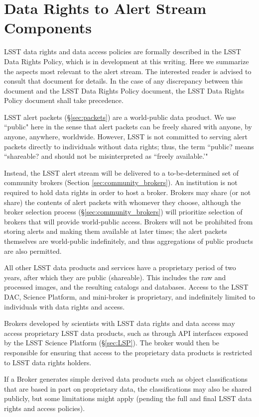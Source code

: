 \section{Data Rights to Alert Stream Components}\label{sec:data_rights}

LSST data rights and data access policies are formally described in the LSST Data Rights Policy, which is in development at this writing.
Here we summarize the aspects most relevant to the alert stream.
The interested reader is advised to consult that document for details.
In the case of any discrepancy between this document and the LSST Data Rights Policy document, the LSST Data Rights Policy document shall take precedence.

LSST alert packets (\S \ref{sec:packets}) are a world-public data product.
We use ``public" here in the sense that alert packets can be freely shared with anyone, by anyone, anywhere, worldwide.
However, LSST is not committed to serving alert packets directly to individuals without data rights; thus, the term ``public? means ``shareable? and should not be misinterpreted as ``freely available.'"

Instead, the LSST alert stream will be delivered to a to-be-determined set of community brokers (Section \ref{sec:community_brokers}).
An institution is not required to hold data rights in order to host a broker.
Brokers may share (or not share) the contents of alert packets with whomever they choose, although the broker selection process (\S \ref{sec:community_brokers}) will prioritize selection of brokers that will provide world-public access.
Brokers will not be prohibited from storing alerts and making them available at later times; the alert packets themselves are world-public indefinitely, and thus aggregations of public products are also permitted.

All other LSST data products and services have a proprietary period of two years, after which they are public (shareable).
This includes the raw and processed images, and the resulting catalogs and databases.
Access to the LSST DAC, Science Platform, and mini-broker is proprietary, and indefinitely limited to individuals with data rights and access.

Brokers developed by scientists with LSST data rights and data access may access proprietary LSST data products, such as through API interfaces exposed by the LSST Science Platform  (\S \ref{sec:LSP}).
The broker would then be responsible for ensuring that access to the proprietary data products is restricted to LSST data rights holders.

If a Broker generates simple derived data products such as object classifications that are based in part on proprietary data, the classifications may also be shared publicly, but some limitations might apply (pending the full and final LSST data rights and access policies).
